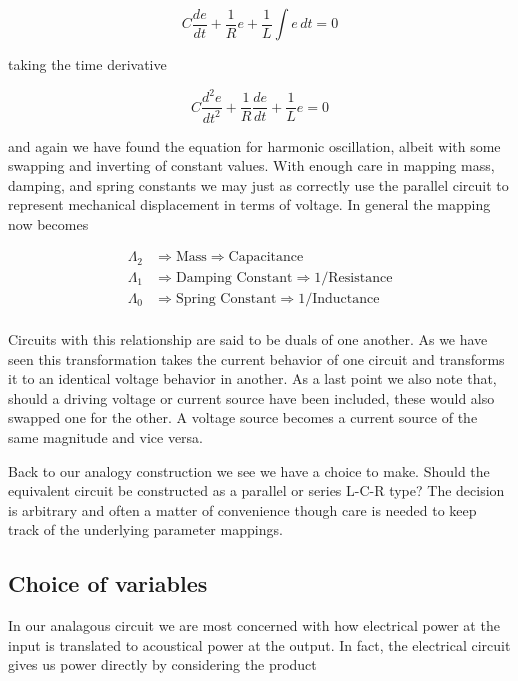 \documentclass[11pt]{book}
\begin{document}
 \begin{equation*}
   C \frac{de}{dt} + \frac{1}{R}e + \frac{1}{L} \int e \,dt = 0
 \end{equation*}

 taking the time derivative

 \begin{equation*}
   C \frac{d^2e}{dt^2} + \frac{1}{R} \frac{de}{dt} + \frac{1}{L}e = 0
 \end{equation*}

 and again we have found the equation for harmonic oscillation, albeit
 with some swapping and inverting of constant values.  With enough
 care in mapping mass, damping, and spring constants we may just as
 correctly use the parallel circuit to represent mechanical
 displacement in terms of voltage.  In general the mapping now becomes

 \begin{align*}
     \Lambda_2 &\Rightarrow \text{Mass} \Rightarrow \text{Capacitance}\\
     \Lambda_1 &\Rightarrow \text{Damping Constant} \Rightarrow \text{1/Resistance}\\
     \Lambda_0 &\Rightarrow \text{Spring Constant} \Rightarrow \text{1/Inductance}\\
 \end{align*}

 Circuits with this relationship are said to be duals of one another.
 As we have seen this transformation takes the current behavior of one
 circuit and transforms it to an identical voltage behavior in
 another.  As a last point we also note that, should a driving voltage or
 current source have been included, these would also swapped one for
 the other.  A voltage source becomes a current source of the same
 magnitude and vice versa.

 Back to our analogy construction we see we have a choice to make.
 Should the equivalent circuit be constructed as a parallel or series
 L-C-R type?  The decision is arbitrary and often a matter of
 convenience though care is needed to keep track of the underlying
 parameter mappings.
\subsection*{Choice of variables}

In our analagous circuit we are most concerned with how electrical
power at the input is translated to acoustical power at the output.
In fact, the electrical circuit gives us power directly by considering
the product
\end{document}
